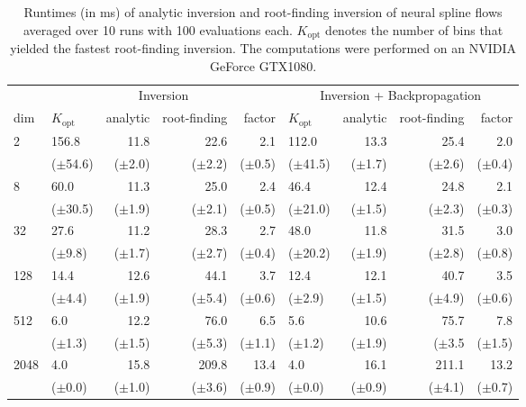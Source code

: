 \documentclass{article}
\begin{document}
\begin{table}[ht]
  \caption{Runtimes (in ms) of analytic inversion and root-finding inversion of neural spline flows averaged over 10 runs with 100 evaluations each. $K_\mathrm{opt}$ denotes the number of bins that yielded the fastest root-finding inversion. The computations were performed on an NVIDIA GeForce GTX1080.}
  \label{tab:performance}
  \centering
  \begin{tabular}{llrrrlrrr}
    \toprule
    {} & \multicolumn{4}{c}{Inversion} & \multicolumn{4}{c}{Inversion + Backpropagation} \\
    \cmidrule(lr){2-5} \cmidrule(lr){6-9}
    dim & $K_\mathrm{opt}$ &  analytic &  root-finding &  factor & $K_\mathrm{opt}$ &  analytic &  root-finding &  factor \\
    \midrule
2& 156.8  &  11.8  &  22.6  &  2.1  &  112.0  &  13.3  &  25.4  &  2.0     \\ 
&  ($\pm$54.6)  &  ($\pm$2.0)  &  ($\pm$2.2)  &  ($\pm$0.5)  &  ($\pm$41.5)  &  ($\pm$1.7)  &  ($\pm$2.6)  &  ($\pm$0.4)     \\ 
8& 60.0  &  11.3  &  25.0  &  2.4  &  46.4  &  12.4  &  24.8  &  2.1     \\ 
& ($\pm$30.5)  &  ($\pm$1.9)  &  ($\pm$2.1)  &  ($\pm$0.5)  &  ($\pm$21.0)  &  ($\pm$1.5)  &  ($\pm$2.3)  &  ($\pm$0.3)    \\ 
32& 27.6  &  11.2  &  28.3  &  2.7  &  48.0  &  11.8  &  31.5  &  3.0     \\ 
&($\pm$9.8)  &  ($\pm$1.7)  &  ($\pm$2.7)  &  ($\pm$0.4)  &  ($\pm$20.2)  &  ($\pm$1.9)  &  ($\pm$2.8)  &  ($\pm$0.8)     \\ 
128& 14.4  &  12.6  &  44.1  &  3.7  &  12.4  &  12.1  &  40.7  &  3.5   \\ 
&($\pm$4.4)  & ($\pm$1.9)  &  ($\pm$5.4)  &  ($\pm$0.6)  &  ($\pm$2.9)  &  ($\pm$1.5)  &  ($\pm$4.9)  &  ($\pm$0.6)    \\ 
512& 6.0  &  12.2  &  76.0  &  6.5  &  5.6  &  10.6  &  75.7  &  7.8     \\ 
&($\pm$1.3)  &  ($\pm$1.5)  &  ($\pm$5.3)  &  ($\pm$1.1)  &  ($\pm$1.2)  &  ($\pm$1.9)  &  ($\pm$3.5  &  ($\pm$1.5)     \\ 
2048& 4.0  &  15.8  &  209.8  &  13.4  &  4.0  &  16.1  &  211.1  &  13.2    \\ 
&($\pm$0.0)  &  ($\pm$1.0)  &  ($\pm$3.6)  &  ($\pm$0.9)  &  ($\pm$0.0)  &  ($\pm$0.9)  &  ($\pm$4.1)  &  ($\pm$0.7)     \\ 
    \bottomrule
\end{tabular}
\end{table}
\end{document}

